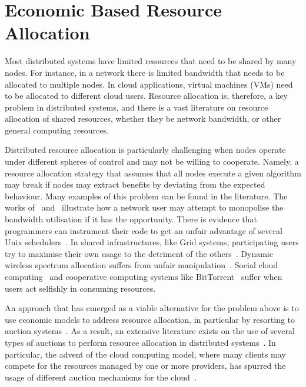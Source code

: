 

\section{Economic Based Resource Allocation}
\label{sec__resource_regulation}


Most distributed systems have limited resources that need to be shared by many nodes. 
For instance, in a network there is limited bandwidth that needs to be allocated to multiple nodes. 
In cloud applications, virtual machines (VMs) need to be allocated to different cloud users. 
Resource allocation is, therefore, a key problem in distributed systems, 
and there is a vast literature on resource allocation of shared resources, 
whether they be network bandwidth, or other general computing resources. %

Distributed resource allocation is particularly challenging when nodes
operate under different spheres of control and may not be willing to cooperate. 
Namely, a resource allocation strategy that assumes that all nodes 
execute a given algorithm may break if nodes 
may extract benefits by deviating from the expected behaviour.
Many examples of this problem can be found in the literature. 
The works of~\cite{Lee2007} and~\cite{Xiao2013} illustrate how
a network user may attempt to monopolise the bandwidth utilisation 
if it has the opportunity. 
There is evidence that programmers can instrument their code 
to get an unfair advantage of several Unix schedulers~\cite{Grosu2005}. 
In shared infrastructures, like Grid systems, participating
users try to maximise their own usage to the detriment of 
the others~\cite{Lai2004}.
Dynamic wireless spectrum allocation suffers from unfair manipulation~\cite{Zhou2008}.
Social cloud computing~\cite{Caton2014}
and cooperative computing systems like BitTorrent~\cite{Liu2010}
suffer when users act selfishly in consuming resources.

An approach that has emerged as a viable alternative for the problem
above is to use economic models to address resource allocation, 
in particular by resorting to auction systems~\cite{Hurwicz1973, Riley1981}. 
As a result, an extensive literature exists on the use of several types of auctions 
to perform resource allocation in distributed systems~\cite{Nisan2001, Niyato2013, Waldspurger1992}. 
In particular, the advent of the cloud computing model, where many
clients may compete for the resources managed by one or more providers, 
has spurred the usage of different auction mechanisms for the cloud~\cite{Wang2012When}.

